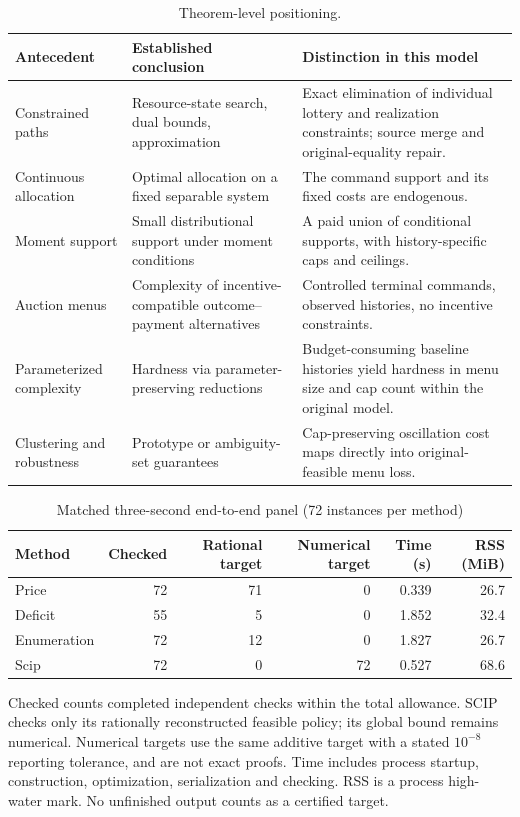 \documentclass[11pt,letterpaper]{article}
\theoremstyle{definition}\newtheorem{remark}[theorem]{Remark}
\begin{document}
\begin{table}[p]\centering\small
\caption{Theorem-level positioning.}\label{tab:antecedents59}
\begin{tabular}{p{}p{}p{}}\toprule
Antecedent & Established conclusion & Distinction in this model \\\midrule
Constrained paths & Resource-state search, dual bounds, approximation & Exact elimination of individual lottery and realization constraints; source merge and original-equality repair.\\
Continuous allocation & Optimal allocation on a fixed separable system & The command support and its fixed costs are endogenous.\\
Moment support & Small distributional support under moment conditions & A paid union of conditional supports, with history-specific caps and ceilings.\\
Auction menus & Complexity of incentive-compatible outcome--payment alternatives & Controlled terminal commands, observed histories, no incentive constraints.\\
Parameterized complexity & Hardness via parameter-preserving reductions & Budget-consuming baseline histories yield hardness in menu size and cap count within the original model.\\
Clustering and robustness & Prototype or ambiguity-set guarantees & Cap-preserving oscillation cost maps directly into original-feasible menu loss.\\\bottomrule
\end{tabular}
\end{table}
\begin{table}[p]\centering\caption{Matched three-second end-to-end panel (72 instances per method)}\label{tab:study59}
\begin{tabular}{lrrrrr}\toprule
Method & Checked & Rational target & Numerical target & Time (s) & RSS (MiB)\\\midrule
Price & 72 & 71 & 0 & 0.339 & 26.7\\
Deficit & 55 & 5 & 0 & 1.852 & 32.4\\
Enumeration & 72 & 12 & 0 & 1.827 & 26.7\\
Scip & 72 & 0 & 72 & 0.527 & 68.6\\
\bottomrule\end{tabular}
\par\smallskip\begin{minipage}{\textwidth}\small Checked counts completed independent checks within the total allowance. SCIP checks only its rationally reconstructed feasible policy; its global bound remains numerical. Numerical targets use the same additive target with a stated $10^{-8}$ reporting tolerance, and are not exact proofs. Time includes process startup, construction, optimization, serialization and checking. RSS is a process high-water mark. No unfinished output counts as a certified target.\end{minipage}\end{table}
\end{document}
